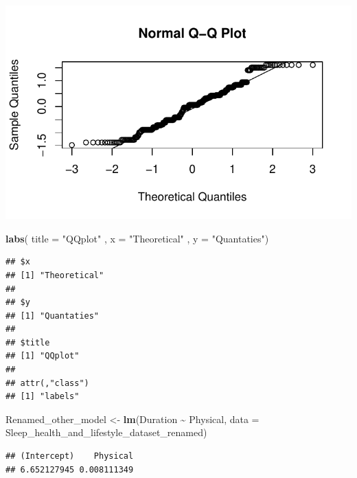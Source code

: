 \documentclass[
  11pt,
]{article}
\newenvironment{Shaded}{\begin{snugshade}}{\end{snugshade}}
\newcommand{\AttributeTok}[1]{\textcolor[rgb]{0.13,0.29,0.53}{#1}}
\newcommand{\FunctionTok}[1]{\textcolor[rgb]{0.13,0.29,0.53}{\textbf{#1}}}
\newcommand{\NormalTok}[1]{#1}
\newcommand{\OtherTok}[1]{\textcolor[rgb]{0.56,0.35,0.01}{#1}}
\newcommand{\SpecialCharTok}[1]{\textcolor[rgb]{0.81,0.36,0.00}{\textbf{#1}}}
\newcommand{\StringTok}[1]{\textcolor[rgb]{0.31,0.60,0.02}{#1}}
\begin{document}
\begin{center}\includegraphics[width=0.7\linewidth]{SleepHelath_files/figure-latex/unnamed-chunk-49-1} \end{center}

\begin{Shaded}
\begin{Highlighting}[]
\FunctionTok{labs}\NormalTok{( }\AttributeTok{title  =} \StringTok{"QQplot"}\NormalTok{ , }\AttributeTok{x =} \StringTok{"Theoretical"}\NormalTok{ , }\AttributeTok{y =} \StringTok{"Quantaties"}\NormalTok{)}
\end{Highlighting}
\end{Shaded}

\begin{verbatim}
## $x
## [1] "Theoretical"
## 
## $y
## [1] "Quantaties"
## 
## $title
## [1] "QQplot"
## 
## attr(,"class")
## [1] "labels"
\end{verbatim}

\begin{Shaded}
\begin{Highlighting}[]
\NormalTok{Renamed\_other\_model }\OtherTok{\textless{}{-}} \FunctionTok{lm}\NormalTok{(Duration }\SpecialCharTok{\textasciitilde{}}\NormalTok{ Physical, }\AttributeTok{data =}\NormalTok{ Sleep\_health\_and\_lifestyle\_dataset\_renamed)}
\end{Highlighting}
\end{Shaded}

\begin{Shaded}
\end{Shaded}

\begin{verbatim}
## (Intercept)    Physical 
## 6.652127945 0.008111349
\end{verbatim}
\end{document}
